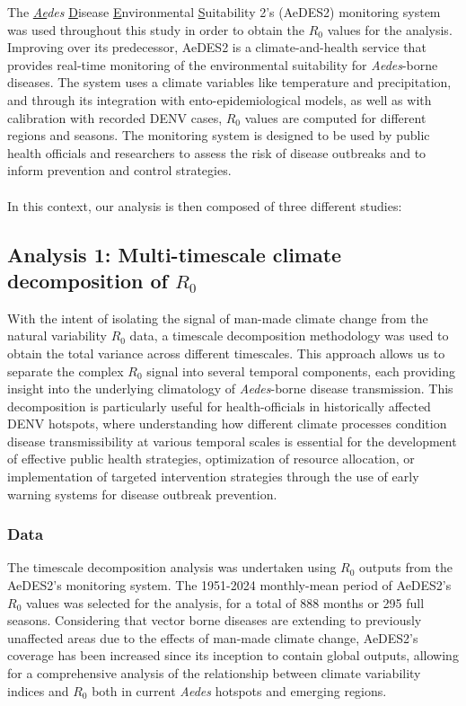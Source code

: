 \documentclass[10pt,twocolumn]{wlscirep}
\begin{document}
The \textit{\underline{Ae}des} \underline{D}isease \underline{E}nvironmental \underline{S}uitability 2's (AeDES2) monitoring system\cite{guerra_2025} was used throughout this study in order to obtain the $R_0$ values for the analysis. Improving over its predecessor\cite{munoz_2020a}, AeDES2 is a climate-and-health service that provides real-time monitoring of the environmental suitability for \textit{Aedes}-borne diseases. The system uses a climate variables like temperature and precipitation, and through its integration with ento-epidemiological models, as well as with calibration with recorded DENV cases, $R_0$ values are computed for different regions and seasons. The monitoring system is designed to be used by public health officials and researchers to assess the risk of disease outbreaks and to inform prevention and control strategies.
\\
\\
In this context, our analysis is then composed of three different studies:

\subsection{Analysis 1: Multi-timescale climate decomposition of $R_0$} \label{sec-methods-1-analysis}

With the intent of isolating the signal of man-made climate change from the natural variability $R_0$ data, a timescale decomposition methodology was used to obtain the total variance across different timescales. This approach allows us to separate the complex $R_0$ signal into several temporal components, each providing insight into the underlying climatology of \textit{Aedes}-borne disease transmission. This decomposition is particularly useful for health-officials in historically affected DENV hotspots, where understanding how different climate processes condition disease transmissibility at various temporal scales is essential for the development of effective public health strategies, optimization of resource allocation, or implementation of targeted intervention strategies through the use of early warning systems for disease outbreak prevention\cite{thomson_2018a, munoz_2016}.

\subsubsection{Data} \label{sec-methods-1-data}
The timescale decomposition analysis was undertaken using $R_0$ outputs from the AeDES2's monitoring system. The 1951-2024 monthly-mean period of AeDES2's $R_0$ values was selected for the analysis, for a total of 888 months or 295 full seasons. Considering that vector borne diseases are extending to previously unaffected areas due to the effects of man-made climate change, AeDES2's coverage has been increased since its inception to contain global outputs, allowing for a comprehensive analysis of the relationship between climate variability indices and $R_0$ both in current \textit{Aedes} hotspots and emerging regions.
\end{document}
